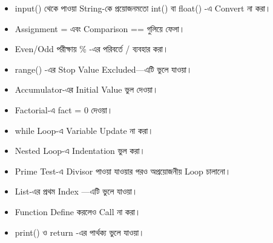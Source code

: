 

\begin{rememberbox}

\begin{itemize}

\item
\textenglish{\ttfamily input()}
থেকে পাওয়া String-কে প্রয়োজনমতো
\textenglish{\ttfamily int()}
বা
\textenglish{\ttfamily float()}
-এ Convert না করা।

\item Assignment
\textenglish{\ttfamily =}
এবং Comparison
\textenglish{\ttfamily ==}
গুলিয়ে ফেলা।

\item Even/Odd পরীক্ষায়
\textenglish{\ttfamily \%}
-এর পরিবর্তে
\textenglish{\ttfamily /}
ব্যবহার করা।

\item
\textenglish{\ttfamily range()}
-এর Stop Value Excluded—এটি ভুলে যাওয়া।

\item Accumulator-এর Initial Value ভুল দেওয়া।

\item Factorial-এ
\textenglish{\ttfamily fact = 0}
দেওয়া।

\item
\textenglish{\ttfamily while}
Loop-এ Variable Update না করা।

\item Nested Loop-এ Indentation ভুল করা।

\item Prime Test-এ Divisor পাওয়া যাওয়ার পরও অপ্রয়োজনীয় Loop চালানো।

\item List-এর প্রথম Index
\textenglish{}
—এটি ভুলে যাওয়া।

\item Function Define করলেও Call না করা।

\item
\textenglish{\ttfamily print()}
ও
\textenglish{\ttfamily return}
-এর পার্থক্য ভুলে যাওয়া।

\end{itemize}

\end{rememberbox}


